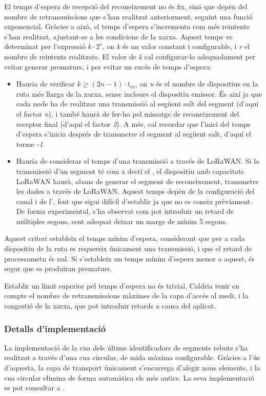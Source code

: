 \documentclass{tfgitic}[2024/07/01]
\begin{document}
{El temps d'espera de recepció del reconeixement no és fix, sinó que depèn del nombre de retransmissions que s'han realitzat anteriorment, seguint una funció exponencial. Gràcies a això, el temps d'espera s'incrementa com més reintents s'han realitzat, ajustant-se a les condicions de la xarxa.
Aquest temps ve determinat per l'expressió $k\cdot 2^r$, on \emph{k} és un valor constant i configurable, i \emph{r} el nombre de reintents realitzats. El valor de \emph{k} cal configurar-lo adequadament per evitar generar  prematurs, i per evitar un excés de temps d'espera:
\begin{itemize}
    \item Hauria de verificar $k\ge (2n-1)\cdot t_{tx}$, on \emph{n} és el nombre de dispositius en la ruta més llarga de la xarxa, sense incloure el dispositiu emissor. És així ja que cada node ha de realitzar una transmissió al següent salt del segment (d'aquí el factor \emph{n}), i també haurà de fer-ho pel missatge de reconeixement del receptor final (d'aquí el factor \emph{2}). A més, cal recordar que l'inici del temps d'espera s'inicia després de transmetre el segment al següent salt, d'aquí el terme \emph{-1}.
    \item Hauria de considerar el temps d'una transmissió a través de LoRaWAN. Si la transmissió d'un segment té com a destí el , el dispositiu amb capacitats LoRaWAN haurà, abans de generar el segment de reconeixement, transmetre les dades a través de LoRaWAN. Aquest temps depèn de la configuració del canal i de l', fent que sigui difícil d'establir ja que no es coneix prèviament. De forma experimental, s'ha observat com pot introduir un retard de múltiples segons, sent adequat deixar un marge de mínim 5 segons. 
\end{itemize}
Aquest criteri estableix el temps mínim d'espera, considerant que per a cada dispositiu de la ruta es requereix únicament una transmissió, i que el retard de processametn és nul. Si s'estableix un temps mínim d'espera menor a aquest, és segur que es produiran  prematurs.

Establir un límit superior pel temps d'espera no és trivial. Caldria tenir en compte el nombre de retransmissions màximes de la capa d'accés al medi, i la congestió de la xarxa, que pot introduir retards a causa del  aplicat. 
\subsubsection{Detalls d'implementació}
La implementació de la cua dels últims identificadors de segments rebuts s'ha realitzat a través d'una cua circular, de mida màxima configurable. Gràcies a l'ús d'aquesta, la capa de transport únicament s'encarrega d'afegir nous elements, i la cua circular elimina de forma automàtica els més antics. La seva implementació es pot consultar a .

}
\end{document}
